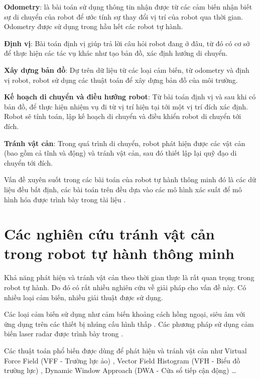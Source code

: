 \textbf{Odometry}: là bài toán sử dụng thông tin nhận được từ các cảm biến nhận biết sự di chuyển của robot để ước tính sự thay đổi vị trí của robot qua thời gian. Odometry được sử dụng trong hầu hết các robot tự hành.

\textbf{Định vị}: Bài toán định vị giúp trả lời câu hỏi robot đang ở đâu, từ đó có cơ sở để thực hiện các tác vụ khác như tạo bản đồ, xác định hướng di chuyển.

\textbf{Xây dựng bản đồ}: Dự trên dữ liệu từ các loại cảm biến, từ odometry và định vị robot, robot sử dụng các thuật toán để xây dựng bản đồ của môi trường.

\textbf{Kế hoạch di chuyển và điều hướng robot}: Từ bài toán định vị và sau khi có bản đồ, để thực hiện nhiệm vụ đi từ vị trí hiện tại tới một vị trí đích xác định. Robot sẽ tính toán, lập kế hoạch di chuyển và điều khiển robot di chuyển tới đích.

\textbf{Tránh vật cản}: Trong quá trình di chuyển, robot phát hiện được các vật cản (bao gồm cả tĩnh và động) và tránh vật cản, sau đó thiết lập lại quỹ đạo di chuyển tới đích.

Vấn đề xuyên suốt trong các bài toán của robot tự hành thông minh đó là các dữ liệu đều bất định, các bài toán trên đều dựa vào các mô hình xác suất để mô hình hóa được trình bày trong tài liệu \cite{thrun2005probabilistic}.


\section{Các nghiên cứu tránh vật cản trong robot tự hành thông minh}
\label{sec:tranhVatCan_ref}

Khả năng phát hiện và tránh vật cản theo thời gian thực là rất quan trọng trong robot tự hành. Do đó có rất nhiều nghiên cứu về giải pháp cho vấn đề này. Có nhiều loại cảm biến, nhiều giải thuật được sử dụng.

Các loại cảm biến sử dụng như cảm biến khoảng cách hồng ngoại, siêu âm với ứng dụng trên các thiết bị nhúng cấu hình thấp \cite{dongyue2013, Susnea2009}. Các phương pháp sử dụng cảm biến laser radar được trình bày trong \cite{Gao2019, Wu2015, Peng2015,Baras2019}.

Các thuật toán phổ biến được dùng để phát hiện và tránh vật cản như Virtual Force Field (VFF - Trường lực ảo) \cite{Borenstein1989}, Vector Field Histogram (VFH - Biểu đồ trường lực) \cite{Borenstein1991}, Dynamic Window Approach (DWA - Cửa sổ tiếp cận động) \cite{Fox1997}\ldots

